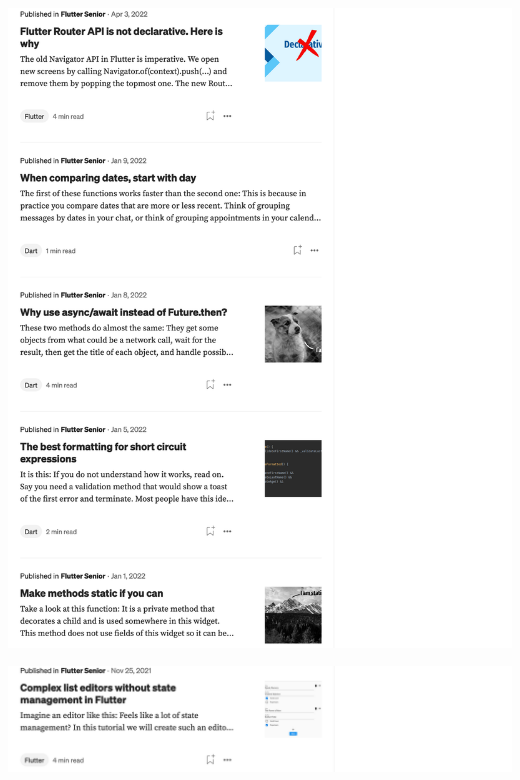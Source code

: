 \Continuing
\begin{center}
    \includegraphics[width=40em]{medium-articles-p12}
\end{center}
\WillContinue
\pagebreak

\Continuing
\begin{center}
    \includegraphics[width=40em]{medium-articles-p13}
\end{center}

\pagebreak
